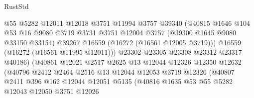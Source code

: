 \begin{lexlean}{RustStd}
\begin{coremodule}
                                @55
                                @5282
                                @12011
                                @12018
                                @3751
                                @11994
                                @3757
                                @39340
                                (@40815
                                  @1646
                                  @104
                                  @53
                                  @16
                                  @9080
                                  @3719
                                  @3731
                                  @3751
                                  @12004
                                  @3757
                                  (@39300 @1645 @9080 @33150 @33154)
                                  @39267
                                  @16559
                                  (@16272 (@16561 @12005 @3719)))
                                @16559
                                (@16272 (@16561 @11995 @12011)))
                              @23302
                              @23305
                              @23308
                              @23312
                              @23317
                              @40186)
                            (@40861
                              @12021
                              @2517
                              @2625
                              @13
                              @12044
                              @12326
                              @12350
                              @12632
                              (@40796
                                @2412
                                @2464
                                @2516
                                @13
                                @12044
                                @12053
                                @3719
                                @12326
                                (@40807
                                  @2411
                                  @396
                                  @162
                                  @12044
                                  @12051
                                  @5135
                                  (@40816
                                    @1635
                                    @53
                                    @55
                                    @5282
                                    @12043
                                    @12050
                                    @3751
                                    @12026

\end{coremodule}
\end{lexlean}
